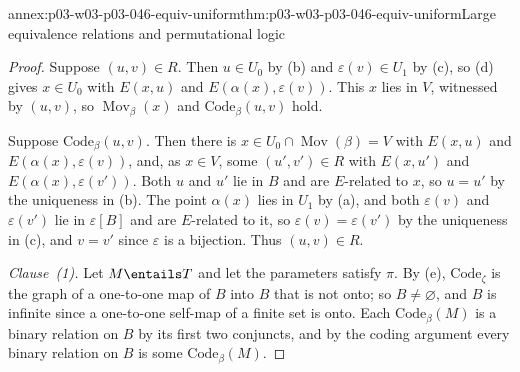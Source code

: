 \begin{annexitem}{annex:p03-w03-p03-046-equiv-uniform}{thm:p03-w03-p03-046-equiv-uniform}{Large equivalence relations and permutational logic}
\begin{proof}
Suppose \((u,v)\in R\). Then \(u\in U_0\) by (b) and \(\varepsilon(v)\in U_1\) by (c),
so (d) gives \(x\in U_0\) with \(E(x,u)\) and \(E(\alpha(x),\varepsilon(v))\).
This \(x\) lies in \(V\), witnessed by \((u,v)\), so
\(\operatorname{Mov}_\beta(x)\) and \(\mathrm{Code}_\beta(u,v)\) hold.

Suppose \(\mathrm{Code}_\beta(u,v)\). Then there is \(x\in U_0\cap
\operatorname{Mov}(\beta)=V\) with \(E(x,u)\) and
\(E(\alpha(x),\varepsilon(v))\), and, as \(x\in V\), some \((u',v')\in R\)
with \(E(x,u')\) and \(E(\alpha(x),\varepsilon(v'))\). Both \(u\) and \(u'\)
lie in \(B\) and are \(E\)-related to \(x\), so \(u=u'\) by the uniqueness
in (b). The point \(\alpha(x)\) lies in \(U_1\) by (a), and both
\(\varepsilon(v)\) and \(\varepsilon(v')\) lie in \(\varepsilon[B]\) and are
\(E\)-related to it, so \(\varepsilon(v)=\varepsilon(v')\) by the
uniqueness in (c), and \(v=v'\) since \(\varepsilon\) is a bijection. Thus
\((u,v)\in R\).

\emph{Clause~(1).} Let \(M\entails T\) and let the parameters satisfy
\(\pi\). By (e), \(\mathrm{Code}_\zeta\) is the graph of a one-to-one map
of \(B\) into \(B\) that is not onto; so \(B\neq\varnothing\), and \(B\) is
infinite since a one-to-one self-map of a finite set is onto. Each
\(\mathrm{Code}_\beta(M)\) is a binary relation on \(B\) by its first two
conjuncts, and by the coding argument every binary relation on \(B\) is
some \(\mathrm{Code}_\beta(M)\).


\end{proof}
\end{annexitem}
